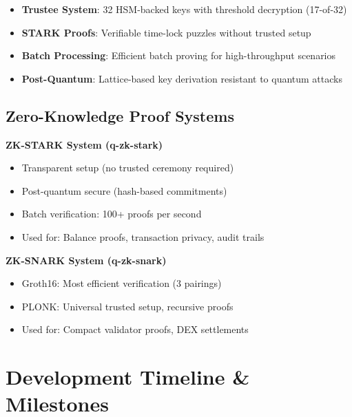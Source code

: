 \documentclass[12pt,a4paper]{article}
\begin{document}
\begin{itemize}
    \item \textbf{Trustee System}: 32 HSM-backed keys with threshold decryption (17-of-32)
    \item \textbf{STARK Proofs}: Verifiable time-lock puzzles without trusted setup
    \item \textbf{Batch Processing}: Efficient batch proving for high-throughput scenarios
    \item \textbf{Post-Quantum}: Lattice-based key derivation resistant to quantum attacks
\end{itemize}

\subsection{Zero-Knowledge Proof Systems}

\begin{statbox}
\textbf{ZK-STARK System (q-zk-stark)}
\begin{itemize}
    \item Transparent setup (no trusted ceremony required)
    \item Post-quantum secure (hash-based commitments)
    \item Batch verification: 100+ proofs per second
    \item Used for: Balance proofs, transaction privacy, audit trails
\end{itemize}
\end{statbox}

\begin{statbox}
\textbf{ZK-SNARK System (q-zk-snark)}
\begin{itemize}
    \item Groth16: Most efficient verification (3 pairings)
    \item PLONK: Universal trusted setup, recursive proofs
    \item Used for: Compact validator proofs, DEX settlements
\end{itemize}
\end{statbox}

\section{Development Timeline \& Milestones}
\end{document}
